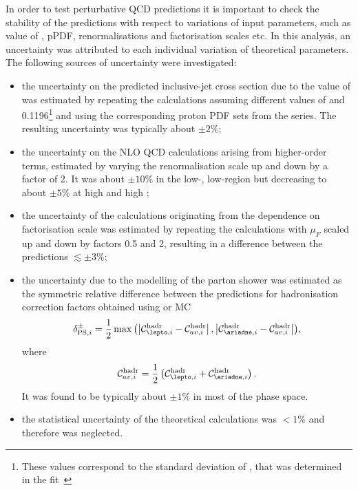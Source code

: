 In order to test perturbative QCD predictions it is important to check the stability of the predictions with respect to variations of input parameters, such as value of \as, pPDF, renormalisations and factorisation scales etc. In this analysis, an uncertainty was attributed to each individual variation of theoretical parameters. The following sources of uncertainty were investigated:
\begin{itemize}
 \item the uncertainty on the predicted inclusive-jet cross section due to the value of \asz was estimated by repeating the calculations assuming different values of  and 0.1196\footnote{These values correspond to the standard deviation of \as, that was determined in the \herapdf fit~\cite{upub:herapdf1.5}} and using the corresponding proton PDF sets from the  series. The resulting uncertainty was typically about $\pm2\%$;
 \item the uncertainty on the NLO QCD calculations arising from higher-order terms, estimated by varying the renormalisation scale up and down by a factor of 2. It was about $\pm10\%$ in the low-\qsq, low-\etjetb region but decreasing to about $\pm5\%$ at high \qsq and high \etjetb;
 \item the uncertainty of the calculations originating from the dependence on factorisation scale was estimated by repeating the calculations with $\mu_F$ scaled up and down by factors 0.5 and 2, resulting in a difference between the predictions $\lesssim\pm 3\%$;
 \item the uncertainty due to the modelling of the parton shower was estimated as the symmetric relative difference between the predictions for hadronisation correction factors obtained using \lepto or \ariadne MC
\begin{equation}
\delta^{\pm}_{\text{PS},i} = \frac{1}{2}\max{\left(\left|\mathcal{C}^\text{hadr}_{\lepto,i} - \mathcal{C}^\text{hadr}_{av,i}\right|,\left|\mathcal{C}^\text{hadr}_{\ariadne,i} - \mathcal{C}^\text{hadr}_{av,i}\right|\right)},
\label{eq:hadrcorunc}
\end{equation}
where
\begin{equation}
\mathcal{C}^\text{hadr}_{av,i} = \frac{1}{2}\left(\mathcal{C}^\text{hadr}_{\lepto,i}+\mathcal{C}^\text{hadr}_{\ariadne,i}\right).\notag
\end{equation}
 It was found to be typically about $\pm 1\%$ in most of the phase space.
\item the statistical uncertainty of the theoretical calculations was $<1\%$ and therefore was neglected.

\end{itemize}

